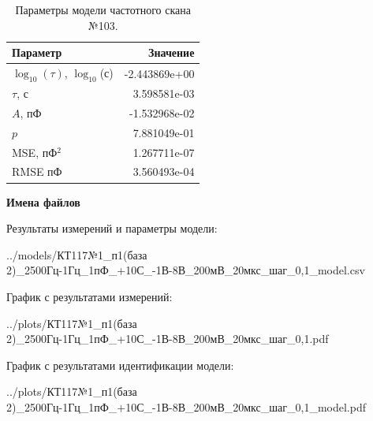 \begin{table}[!ht]
    \centering
    \caption{Параметры модели частотного скана №103.}
    \begin{tabular}{|l|r|}
        \hline
        Параметр                                       & Значение                  \\ \hline
        $\log_{10}(\tau)$, $\log_{10}$(с)              & -2.443869e+00             \\ \hline
        $\tau$, с                                      & 3.598581e-03              \\ \hline
        $A$, пФ                                        & -1.532968e-02             \\ \hline
        $p$                                            & 7.881049e-01              \\ \hline
        MSE, пФ$^2$                                    & 1.267711e-07              \\ \hline
        RMSE пФ                                        & 3.560493e-04              \\ \hline
    \end{tabular}
    \label{table:frequency_scan_model_103}
\end{table}

\textbf{Имена файлов}

Результаты измерений и параметры модели:

\scriptsize../models/КТ117№1\_п1(база 2)\_2500Гц-1Гц\_1пФ\_+10С\_-1В-8В\_200мВ\_20мкс\_шаг\_0,1\_model.csv
\normalsize

График с результатами измерений:

\scriptsize../plots/КТ117№1\_п1(база 2)\_2500Гц-1Гц\_1пФ\_+10С\_-1В-8В\_200мВ\_20мкс\_шаг\_0,1.pdf
\normalsize

График с результатами идентификации модели:

\scriptsize../plots/КТ117№1\_п1(база 2)\_2500Гц-1Гц\_1пФ\_+10С\_-1В-8В\_200мВ\_20мкс\_шаг\_0,1\_model.pdf
\normalsize

